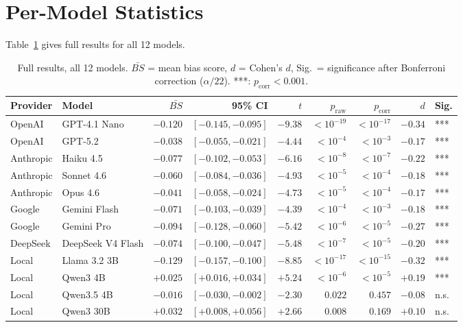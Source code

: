 \documentclass[10pt,twocolumn]{article}
\begin{document}
\section{Per-Model Statistics}
\label{app:model_stats}

Table~\ref{tab:model_detail} gives full results for all 12 models.

\begin{table}[h]
\centering
\small
\begin{tabular}{llrrrrrrl}
\toprule
\textbf{Provider} & \textbf{Model} & $\bar{BS}$ & \textbf{95\% CI} & $t$ & $p_\text{raw}$ & $p_\text{corr}$ & $d$ & \textbf{Sig.} \\
\midrule
OpenAI & GPT-4.1 Nano & $-0.120$ & $[-0.145, -0.095]$ & $-9.38$ & $< 10^{-19}$ & $< 10^{-17}$ & $-0.34$ & *** \\
OpenAI & GPT-5.2 & $-0.038$ & $[-0.055, -0.021]$ & $-4.44$ & $< 10^{-4}$ & $< 10^{-3}$ & $-0.17$ & *** \\
\midrule
Anthropic & Haiku 4.5 & $-0.077$ & $[-0.102, -0.053]$ & $-6.16$ & $< 10^{-8}$ & $< 10^{-7}$ & $-0.22$ & *** \\
Anthropic & Sonnet 4.6 & $-0.060$ & $[-0.084, -0.036]$ & $-4.93$ & $< 10^{-5}$ & $< 10^{-4}$ & $-0.18$ & *** \\
Anthropic & Opus 4.6 & $-0.041$ & $[-0.058, -0.024]$ & $-4.73$ & $< 10^{-5}$ & $< 10^{-4}$ & $-0.17$ & *** \\
\midrule
Google & Gemini Flash & $-0.071$ & $[-0.103, -0.039]$ & $-4.39$ & $< 10^{-4}$ & $< 10^{-3}$ & $-0.18$ & *** \\
Google & Gemini Pro & $-0.094$ & $[-0.128, -0.060]$ & $-5.42$ & $< 10^{-6}$ & $< 10^{-5}$ & $-0.27$ & *** \\
\midrule
DeepSeek & DeepSeek V4 Flash & $-0.074$ & $[-0.100, -0.047]$ & $-5.48$ & $< 10^{-7}$ & $< 10^{-5}$ & $-0.20$ & *** \\
\midrule
Local & Llama 3.2 3B & $-0.129$ & $[-0.157, -0.100]$ & $-8.85$ & $< 10^{-17}$ & $< 10^{-15}$ & $-0.32$ & *** \\
Local & Qwen3 4B & $+0.025$ & $[+0.016, +0.034]$ & $+5.24$ & $< 10^{-6}$ & $< 10^{-5}$ & $+0.19$ & *** \\
Local & Qwen3.5 4B & $-0.016$ & $[-0.030, -0.002]$ & $-2.30$ & $0.022$ & $0.457$ & $-0.08$ & n.s. \\
Local & Qwen3 30B & $+0.032$ & $[+0.008, +0.056]$ & $+2.66$ & $0.008$ & $0.169$ & $+0.10$ & n.s. \\
\bottomrule
\end{tabular}
\caption{Full results, all 12 models. $\bar{BS}$ = mean bias score, $d$ = Cohen's $d$, Sig.\ = significance after Bonferroni correction ($\alpha/22$). ***: $p_\text{corr} < 0.001$.}
\label{tab:model_detail}
\end{table}
\end{document}
